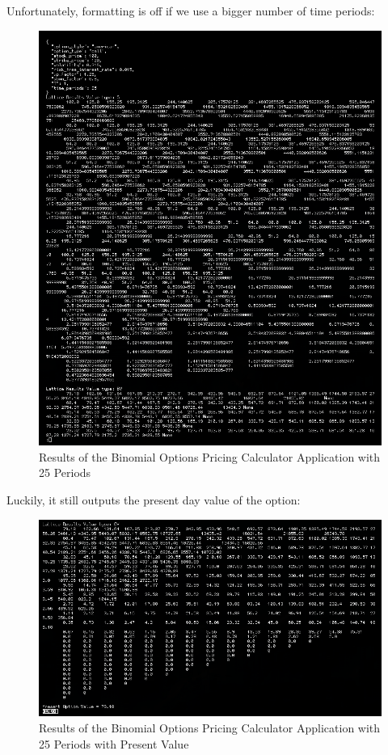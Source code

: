 \documentclass[12pt, letterpaper]{article}\usepackage{float}
\begin{document}
\pagebreak
Unfortunately, formatting is off if we use a bigger number of time periods:
\begin{figure}[H]
  \includegraphics[scale=0.55]{bopm_output_screenshot_25steps.png}
  \caption{Results of the Binomial Options Pricing Calculator Application with 25 Periods}
\end{figure}

\pagebreak
Luckily, it still outputs the present day value of the option:
\begin{figure}[H]
  \includegraphics[scale=0.55]{bopm_output_screenshot_25steps_PV.png}
  \caption{Results of the Binomial Options Pricing Calculator Application with 25 Periods with Present Value}
\end{figure}
\end{document}
